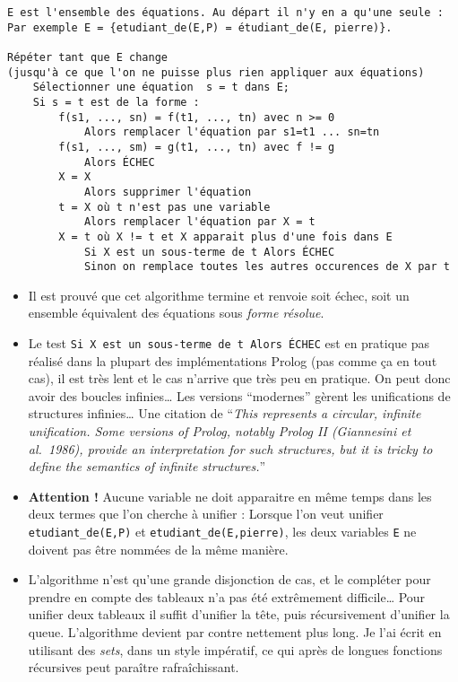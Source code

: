 \documentclass{article}
\begin{document}
\begin{verbatim}
E est l'ensemble des équations. Au départ il n'y en a qu'une seule :
Par exemple E = {etudiant_de(E,P) = étudiant_de(E, pierre)}.

Répéter tant que E change
(jusqu'à ce que l'on ne puisse plus rien appliquer aux équations)
    Sélectionner une équation  s = t dans E;
    Si s = t est de la forme :
        f(s1, ..., sn) = f(t1, ..., tn) avec n >= 0
            Alors remplacer l'équation par s1=t1 ... sn=tn
        f(s1, ..., sm) = g(t1, ..., tn) avec f != g
            Alors ÉCHEC
        X = X
            Alors supprimer l'équation
        t = X où t n'est pas une variable
            Alors remplacer l'équation par X = t
        X = t où X != t et X apparait plus d'une fois dans E
            Si X est un sous-terme de t Alors ÉCHEC
            Sinon on remplace toutes les autres occurences de X par t
\end{verbatim}

\begin{itemize}
  \item
    Il est prouvé que cet algorithme termine et renvoie soit échec, soit un ensemble équivalent des équations sous \emph{forme résolue}.
  \item
    Le test \texttt{Si\ X\ est\ un\ sous-terme\ de\ t\ Alors\ ÉCHEC} est en pratique pas réalisé dans la plupart des implémentations Prolog (pas comme ça en tout cas), il est très lent et le cas n'arrive que très peu en pratique. On peut donc avoir des boucles infinies\ldots{} Les versions ``modernes'' gèrent les unifications de structures infinies\ldots{} Une citation de \cite{Norvig} ``\emph{This represents a circular, infinite unification. Some versions of Prolog, notably Prolog II (Giannesini et al.~1986), provide an interpretation for such structures, but it is tricky to define the semantics of infinite structures.}''
  \item
    \textbf{Attention !} Aucune variable ne doit apparaitre en même temps dans les deux termes que l'on cherche à unifier : Lorsque l'on veut unifier \texttt{etudiant\_de(E,P)} et \texttt{etudiant\_de(E,pierre)}, les deux variables \texttt{E} ne doivent pas être nommées de la même manière.
  \item
    L'algorithme n'est qu'une grande disjonction de cas, et le compléter pour prendre en compte des tableaux n'a pas été extrêmement difficile\ldots{} Pour unifier deux tableaux il suffit d'unifier la tête, puis récursivement d'unifier la queue. L'algorithme devient par contre nettement plus long. Je l'ai écrit en utilisant des \emph{sets}, dans un style impératif, ce qui après de longues fonctions récursives peut paraître rafraîchissant.
\end{itemize}
\end{document}
